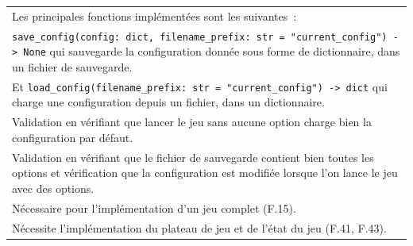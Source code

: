 \documentclass[a4paper,12pt]{article}
\begin{document}
\begin{tabularx}{\textwidth}{|X|}
    Les principales fonctions implémentées sont les suivantes~:                                                                                                                                                                                \\
    \texttt{save\_config(config: dict, filename\_prefix: str = "current\_config")
        -> None} qui sauvegarde la configuration donnée sous forme de dictionnaire,
    dans un fichier de sauvegarde.                                                                                                                                                                                                             \\ Et \texttt{load\_config(filename\_prefix: str
        = "current\_config") -> dict} qui charge une configuration depuis un fichier,
    dans un dictionnaire.                                                                                                                                                                                                                      \\ \arrayrulecolor{MediumAquamarine}\hline
    \arrayrulecolor{RoyalBlue} Validation en vérifiant que lancer le jeu sans
    aucune option charge bien la configuration par défaut.                                                                                                                                                                                     \\ Validation en
    vérifiant que le fichier de sauvegarde contient bien toutes les options et
    vérification que la configuration est modifiée lorsque l’on lance le jeu avec
    des options.                                                                                                                                                                                                                               \\ \arrayrulecolor{MediumAquamarine}\hline
    \arrayrulecolor{RoyalBlue} Nécessaire pour l’implémentation d’un jeu complet
    (F.15).                                                                                                                                                                                                                                    \\ Nécessite l’implémentation du plateau de jeu et de l’état du jeu
    (F.41, F.43).                                                                                                                                                                                                                              \\ \hline
\end{tabularx}
\end{document}
